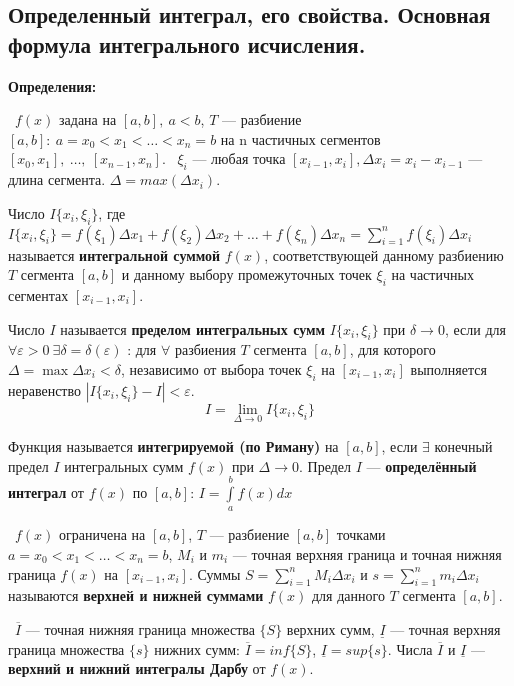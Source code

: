 \subsection{Определенный интеграл, его свойства. Основная формула интегрального исчисления.}

\textbf{Определения:}

\mathLet \ $f(x)$ задана на $[a,b],~a<b$, $T$ --- разбиение $[a,b]:~a=x_0 < x_1 < \dots < x_n = b$ на n частичных сегментов $[x_0,x_1],~\dots,~[x_{n-1},x_n]$. \mathLet \ $\xi_i$  --- любая точка $[x_{i-1}, x_i], \Delta x_i = x_i - x_{i-1}$ --- длина сегмента. $\Delta = max(\Delta x_i)$.

\bigbreak
Число $I\{x_i, \xi_i\}$, где
$I\{x_i,\xi_i\} = f(\xi_1) \Delta x_1 + f(\xi_2) \Delta x_2 + \dots + f(\xi_n) \Delta x_n = \displaystyle\sum_{i=1}^n f(\xi_i) \Delta x_i$ называется \textbf{интегральной суммой} $f(x)$, соответствующей данному разбиению $T$ сегмента $[a, b]$ и данному выбору промежуточных точек $\xi_i$ на частичных сегментах $[x_{i-1}, x_i]$.

\bigbreak
Число $I$ называется \textbf{пределом интегральных сумм} $I\{x_i, \xi_i\}$ при $\delta \to 0$, если для $\forall \varepsilon > 0~\exists \delta = \delta(\varepsilon)$ : для $\forall$ разбиения $T$ сегмента $[a, b]$, для которого $\Delta  = \max \Delta x_i < \delta$, независимо от выбора точек $\xi_i$ на $[x_{i-1}, x_i]$ выполняется неравенство $|I\{x_i, \xi_i\} - I| < \varepsilon$.
$$I = \lim\limits_{\Delta \to 0} I\{x_i,\xi_i\} $$

\bigbreak
Функция называется \textbf{интегрируемой (по Риману)} на $[a, b]$, если $\exists$ конечный предел $I$ интегральных сумм $f(x)$ при $\Delta \to 0$. Предел $I$ --- \textbf{определённый интеграл} от $f(x)$ по $[a,b]$: $I = \int\limits_a^b f(x)dx$

\bigbreak
\mathLet \ $f(x)$ ограничена на $[a, b]$, $T$ --- разбиение $[a, b]$ точками $a = x_0 < x_1 < \dots < x_n = b$, $M_i$ и $m_i$ --- точная верхняя граница и точная нижняя граница $f(x)$ на $[x_{i-1}, x_i]$. Суммы $S = \sum_{i=1}^n M_i\Delta x_i$ и $s = \sum_{i=1}^n m_i\Delta x_i$ называются \textbf{верхней и нижней суммами} $f(x)$ для данного $T$ сегмента $[a,b]$.

\bigbreak
\mathLet \ $\overline{I}$ --- точная нижняя граница множества $\{S\}$ верхних сумм, $\underline{I}$ --- точная верхняя граница множества $\{s\}$ нижних сумм: $\overline{I} = inf\{S\}$, $\underline{I} = sup\{s\}$. Числа $\overline{I}$ и $\underline{I}$ --- \textbf{верхний и нижний интегралы Дарбу} от $f(x)$.

